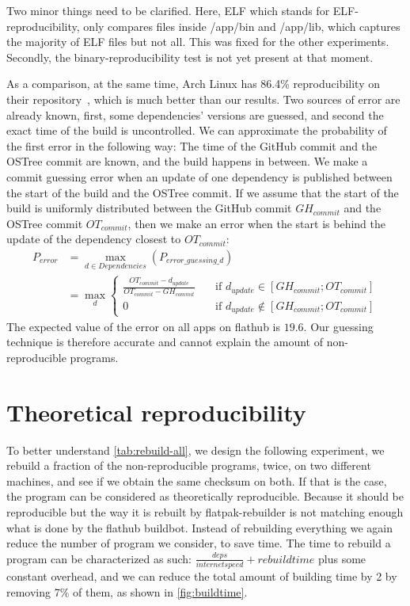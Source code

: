 \documentclass[a4paper,11pt,oneside]{report}
\theoremstyle{definition}
\newcommand{\sysname}{flatpak-rebuilder\xspace}
\newcommand{\fh}{flathub\xspace}
\newcommand{\fhbb}{flathub buildbot\xspace}
\newcommand{\ot}{OSTree\xspace}
\begin{document}
Two minor things need to be clarified. Here, ELF which stands for
ELF-reproducibility, only compares files inside /app/bin and /app/lib, which
captures the majority of ELF files but not all. This was fixed for the other
experiments. Secondly, the binary-reproducibility test is not yet present at
that moment.

As a comparison, at the same time, Arch Linux has 86.4\% reproducibility on
their repository~\cite{arch-rebuilderd}, which is much better than our results.
Two sources of error are already known, first, some dependencies' versions are
guessed, and second the exact time of the build is uncontrolled. We can
approximate the probability of the first error in the following way: The time
of the GitHub commit and the \ot commit are known, and the build happens in
between. We make a commit guessing error when an update of one dependency is
published between the start of the build and the \ot commit. If we assume that
the start of the build is uniformly distributed between the GitHub commit
$GH_{commit}$ and the \ot commit $OT_{commit}$, then we make an error when the
start is behind the update of the dependency closest to $OT_{commit}$:
\begin{align*}
    P_{error} &= \max_{d \in Dependencies}(P_{error\_guessing\_d}) \\
              &= \max_{d}
              \begin{cases}
                \frac{OT_{commit} - d_{update}}{OT_{commit} -
                    GH_{commit}}  & \quad \text{if } d_{update}
                    \in [GH_{commit}; OT_{commit}] \\
                0  & \quad \text{if } d_{update}
                  \notin [GH_{commit}; OT_{commit}]
              \end{cases}
\end{align*}
The expected value of the error on all apps on \fh is $19.6$. Our guessing
technique is therefore accurate and cannot explain the amount of
non-reproducible programs.


\section{Theoretical reproducibility}
\label{sec:theo-repro}
To better understand \autoref{tab:rebuild-all}, we design the following
experiment, we rebuild a fraction of the non-reproducible programs, twice, on
two different machines, and see if we obtain the same checksum on both. If that
is the case, the program can be considered as theoretically reproducible.
Because it should be reproducible but the way it is rebuilt by \sysname is not
matching enough what is done by the \fhbb. Instead of rebuilding everything we
again reduce the number of program we consider, to save time. The time to
rebuild a program can be characterized as such: $\frac{deps}{internet speed} +
rebuild time$ plus some constant overhead, and we can reduce the total amount
of building time by 2 by removing 7\% of them, as shown in
\autoref{fig:buildtime}.
\end{document}
